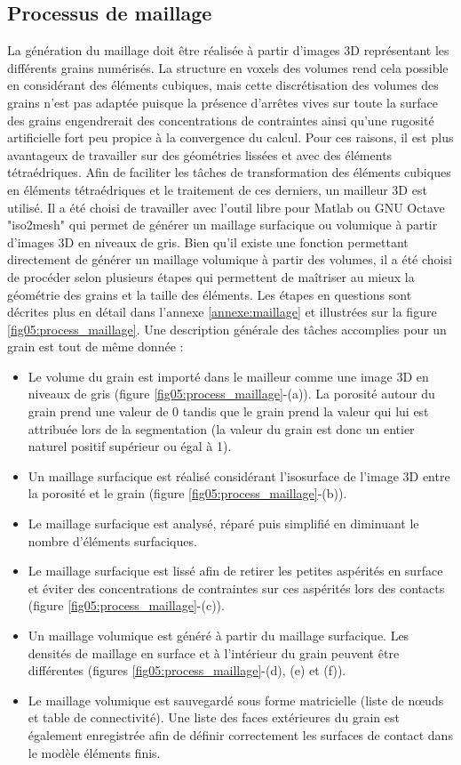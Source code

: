 	\subsection{Processus de maillage}
		La génération du maillage doit être réalisée à partir d'images 3D représentant les différents grains numérisés. La structure en voxels des volumes rend cela possible en considérant des éléments cubiques, mais cette discrétisation des volumes des grains n'est pas adaptée puisque la présence d'arrêtes vives sur toute la surface des grains engendrerait des concentrations de contraintes ainsi qu'une rugosité artificielle fort peu propice à la convergence du calcul. Pour ces raisons, il est plus avantageux de travailler sur des géométries lissées et avec des éléments tétraédriques. Afin de faciliter les tâches de transformation des éléments cubiques en éléments tétraédriques et le traitement de ces derniers, un mailleur 3D est utilisé. Il a été choisi de travailler avec l'outil libre pour Matlab ou GNU Octave "iso2mesh" \citep{fang_tetrahedral_2009} qui permet de générer un maillage surfacique ou volumique à partir d'images 3D en niveaux de gris. Bien qu'il existe une fonction permettant directement de générer un maillage volumique à partir des volumes, il a été choisi de procéder selon plusieurs étapes qui permettent de maîtriser au mieux la géométrie des grains et la taille des éléments. Les étapes en questions sont décrites plus en détail dans l'annexe \ref{annexe:maillage} et illustrées sur la figure \ref{fig05:process_maillage}. Une description générale des tâches accomplies pour un grain est tout de même donnée :
		\begin{itemize}
			\item Le volume du grain est importé dans le mailleur comme une image 3D en niveaux de gris (figure \ref{fig05:process_maillage}-(a)). La porosité autour du grain prend une valeur de \num{0} tandis que le grain prend la valeur qui lui est attribuée lors de la segmentation (la valeur du grain est donc un entier naturel positif supérieur ou égal à \num{1}).
			\item Un maillage surfacique est réalisé considérant l'isosurface de l'image 3D entre la porosité et le grain (figure \ref{fig05:process_maillage}-(b)).
			\item Le maillage surfacique est analysé, réparé puis simplifié en diminuant le nombre d'éléments surfaciques.
			\item Le maillage surfacique est lissé afin de retirer les petites aspérités en surface et éviter des concentrations de contraintes sur ces aspérités lors des contacts (figure \ref{fig05:process_maillage}-(c)).
			\item Un maillage volumique est généré à partir du maillage surfacique. Les densités de maillage en surface et à l'intérieur du grain peuvent être différentes (figures \ref{fig05:process_maillage}-(d), (e) et (f)).
			\item Le maillage volumique est sauvegardé sous forme matricielle (liste de n\oe{}uds et table de connectivité). Une liste des faces extérieures du grain est également enregistrée afin de définir correctement les surfaces de contact dans le modèle éléments finis.
		\end{itemize}

